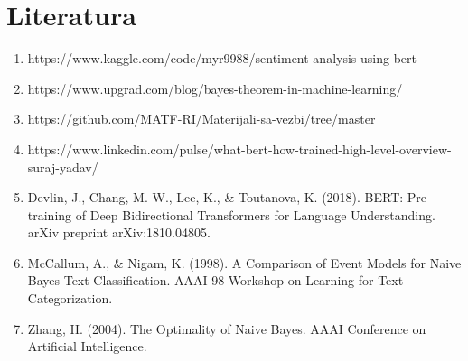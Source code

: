 \documentclass{article}
\begin{document}
\section{Literatura}
    \begin{enumerate}
        \item https://www.kaggle.com/code/myr9988/sentiment-analysis-using-bert
        
        \item https://www.upgrad.com/blog/bayes-theorem-in-machine-learning/
        \item https://github.com/MATF-RI/Materijali-sa-vezbi/tree/master
        \item https://www.linkedin.com/pulse/what-bert-how-trained-high-level-overview-suraj-yadav/
        \item Devlin, J., Chang, M. W., Lee, K., & Toutanova, K. (2018). BERT: Pre-training of Deep Bidirectional Transformers for Language Understanding. arXiv preprint arXiv:1810.04805.
        \item McCallum, A., & Nigam, K. (1998). A Comparison of Event Models for Naive Bayes Text Classification. AAAI-98 Workshop on Learning for Text Categorization.
        \item Zhang, H. (2004). The Optimality of Naive Bayes. AAAI Conference on Artificial Intelligence.
        

    \end{enumerate}
\end{document}
